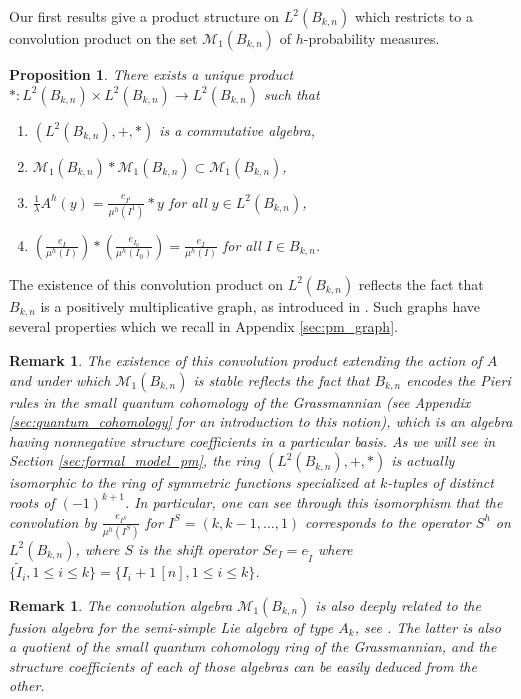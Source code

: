 \documentclass[10pt,11pt]{amsart}%
\newtheorem{proposition}[theorem]{Proposition}
\newtheorem{remark}[theorem]{Remark}
\begin{document}
Our first results give a product structure on $L^2(B_{k,n})$ which restricts to a convolution product on the set $\mathcal{M}_{1}(B_{k,n})$ of $h$-probability measures.
\begin{proposition}\label{prop:result_1}
There exists a unique product $*:L^2(B_{k,n})\times L^2(B_{k,n})\rightarrow L^2(B_{k,n})$ such that 
\begin{enumerate}
\item $(L^2(B_{k,n}),+,*)$ is a commutative algebra,
\item $\mathcal{M}_{1}(B_{k,n})*\mathcal{M}_{1}(B_{k,n})\subset \mathcal{M}_{1}(B_{k,n})$,
\item $\frac{1}{\lambda}A^h(y)=\frac{e_{I^1}}{\mu^h(I^1)}*y$ for all $y\in L^2(B_{k,n})$,
\item $\left(\frac{e_{I}}{\mu^h(I)}\right)* \left(\frac{e_{I_0}}{\mu^h(I_0)}\right)=\frac{e_{I}}{\mu^h(I)}$ for all $I\in B_{k,n}$.
\end{enumerate}
\end{proposition}
The existence of this convolution product on $L^2(B_{k,n})$ reflects the fact that $B_{k,n}$ is a positively multiplicative graph, as introduced in \cite{GLT}. Such graphs have several properties which we recall in Appendix \ref{sec:pm_graph}. 
\begin{remark}\label{rem:qcoho_convolution}
The existence of this convolution product extending the action of $A$ and under which $\mathcal{M}_1(B_{k,n})$ is stable reflects the fact that $B_{k,n}$ encodes the Pieri rules in the small quantum cohomology of the Grassmannian (see Appendix \ref{sec:quantum_cohomology} for an introduction to this notion), which is an algebra having nonnegative structure coefficients in a particular basis. As we will see in Section \ref{sec:formal_model_pm}, the ring $(L^2(B_{k,n}),+,*)$ is actually isomorphic to the ring of symmetric functions specialized at $k$-tuples of distinct roots of $(-1)^{k+1}$. In particular, one can see through this isomorphism that the convolution by $\frac{e_{I^S}}{\mu^h(I^S)}$ for $I^S=(k,k-1,\ldots,1)$ corresponds to the operator $S^h$ on $L^2(B_{k,n})$, where $S$ is the shift operator 
$Se_{I}=e_{\tilde{I}}$ where $\{\tilde{I}_i,1\leq i\leq k\}=\{I_i+1 \,[n], 1\leq i\leq k\}$.
\end{remark}
\begin{remark}
The convolution algebra $\mathcal{M}_1(B_{k,n})$ is also deeply related to the fusion algebra for the semi-simple Lie algebra of type $A_k$, see \cite{De}. The latter is also a quotient of the small quantum cohomology ring of the Grassmannian, and the structure coefficients of each of those algebras can be easily deduced from the other.
\end{remark}
\end{document}
